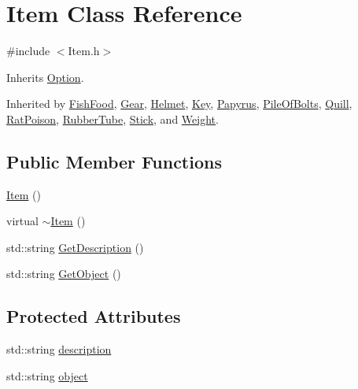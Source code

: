 \hypertarget{class_item}{}\section{Item Class Reference}
\label{class_item}


{\ttfamily \#include $<$Item.\+h$>$}



Inherits \mbox{\hyperlink{class_option}{Option}}.



Inherited by \mbox{\hyperlink{class_fish_food}{Fish\+Food}}, \mbox{\hyperlink{class_gear}{Gear}}, \mbox{\hyperlink{class_helmet}{Helmet}}, \mbox{\hyperlink{class_key}{Key}}, \mbox{\hyperlink{class_papyrus}{Papyrus}}, \mbox{\hyperlink{class_pile_of_bolts}{Pile\+Of\+Bolts}}, \mbox{\hyperlink{class_quill}{Quill}}, \mbox{\hyperlink{class_rat_poison}{Rat\+Poison}}, \mbox{\hyperlink{class_rubber_tube}{Rubber\+Tube}}, \mbox{\hyperlink{class_stick}{Stick}}, and \mbox{\hyperlink{class_weight}{Weight}}.

\subsection*{Public Member Functions}
\begin{DoxyCompactItemize}
\item 
\mbox{\hyperlink{class_item_a297720c02984eab37332ae795d22189d}{Item}} ()
\item 
virtual \mbox{\hyperlink{class_item_a33cc9c0bc556b5a33a9d0d58d37c602b}{$\sim$\+Item}} ()
\item 
std\+::string \mbox{\hyperlink{class_item_a1d6f84eec4fee86d5d6c4be99152c86c}{Get\+Description}} ()
\item 
std\+::string \mbox{\hyperlink{class_item_a452e4e30bc473c454af2e635fce18db6}{Get\+Object}} ()
\end{DoxyCompactItemize}
\subsection*{Protected Attributes}
\begin{DoxyCompactItemize}
\item 
std\+::string \mbox{\hyperlink{class_item_a7417563f4b149d5e531cea1e993f66f6}{description}}
\item 
std\+::string \mbox{\hyperlink{class_item_ac783075d151891b9365b807e5d42b4b7}{object}}
\end{DoxyCompactItemize}


